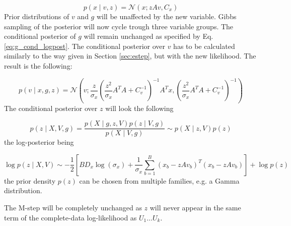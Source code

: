 \documentclass{paper}
\begin{document}
\begin{equation}
p(x \mid v,z) = \mathcal{N}(x; zAv,C_x)
\end{equation}
%
Prior distributions of $v$ and $g$ will be unaffected by the new variable. Gibbs sampling of the posterior will now cycle trough three variable groups. The conditional posterior of $g$ will remain unchanged as specified by Eq. \ref{eq:g_cond_logpost}. The conditional posterior over $v$ has to be calculated similarly to the way given in Section \ref{sec:estep}, but with the new likelihood. The result is the following:

\begin{equation}
p(v \mid x,g,z) = \mathcal{N}\left(v; \frac{z}{ \sigma_x} \left( \frac{z^2}{ \sigma_x} A^T A + C_v^{-1}\right)^{-1} A^T x, \left(\frac{z^2}{\sigma_x} A^T A + C_v^{-1}\right)^{-1}\right)
\end{equation}
%
The conditional posterior over $z$ will look the following

\begin{equation} 
p(z \mid X,V,g) = \frac{p(X \mid g,z,V) p(z \mid V,g)}{p(X \mid V,g)} \sim p(X \mid z,V) p(z)
\end{equation}
% 
the log-posterior being

\begin{equation} 
\log p(z \mid X,V) \sim -\frac{1}{2} \left[B D_x\log(\sigma_x) + \frac{1}{\sigma_x} \sum_{b=1}^B (x_b - zAv_b)^T (x_b - zAv_b)\right] + \log p(z)
\end{equation}
%
the prior density $p(z)$ can be chosen from multiple families, e.g. a Gamma distribution.

The M-step will be completely unchanged as $z$ will never appear in the same term of the complete-data log-likelihood as $U_1 \dots U_k$.
\end{document}
